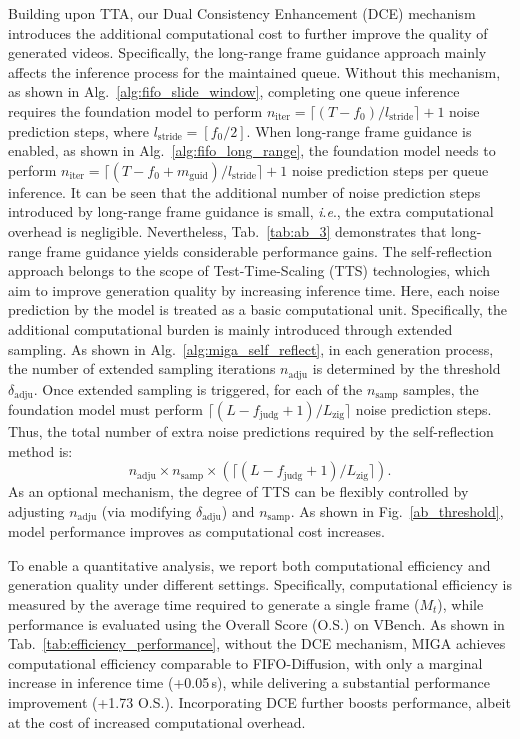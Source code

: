 \documentclass{article}
\theoremstyle{plain}
\theoremstyle{definition}
\theoremstyle{remark}
\newcommand{\ie}{\textit{i}.\textit{e}.}
\begin{document}
Building upon TTA, our Dual Consistency Enhancement (DCE) mechanism introduces the additional computational cost to further improve the quality of generated videos.
Specifically, the long-range frame guidance approach mainly affects the inference process for the maintained queue. Without this mechanism, as shown in Alg.~\ref{alg:fifo_slide_window}, completing one queue inference requires the foundation model to perform $n_\mathrm{iter} = \lceil (T - f_0) / l_\mathrm{stride} \rceil + 1$ noise prediction steps, where $l_\mathrm{stride} = [f_0 / 2]$.
When long-range frame guidance is enabled, as shown in Alg.~\ref{alg:fifo_long_range}, the foundation model needs to perform $n_\mathrm{iter} = \lceil (T - f_0 + m_\mathrm{guid}) / l_\mathrm{stride} \rceil + 1$ noise prediction steps per queue inference.  
It can be seen that the additional number of noise prediction steps introduced by long-range frame guidance is small, \ie, the extra computational overhead is negligible.
Nevertheless, Tab.~\ref{tab:ab_3} demonstrates that long-range frame guidance yields considerable performance gains.
The self-reflection approach belongs to the scope of Test-Time-Scaling (TTS) technologies, which aim to improve generation quality by increasing inference time. Here, each noise prediction by the model is treated as a basic computational unit.
Specifically, the additional computational burden is mainly introduced through extended sampling. 
As shown in Alg.~\ref{alg:miga_self_reflect}, in each generation process, the number of extended sampling iterations $n_{\mathrm{adju}}$ is determined by the threshold $\delta_{\mathrm{adju}}$. Once extended sampling is triggered, for each of the $n_{\mathrm{samp}}$ samples, the foundation model must perform $ \lceil (L - f_{\mathrm{judg}}+1) / L_{\mathrm{zig}} \rceil$ noise prediction steps.
Thus, the total number of extra noise predictions required by the self-reflection method is:
\begin{equation}
n_{\mathrm{adju}} \times n_{\mathrm{samp}} \times  \left( \lceil (L - f_{\mathrm{judg}}+1) / L_{\mathrm{zig}} \rceil \right ).
\end{equation}
As an optional mechanism, the degree of TTS can be flexibly controlled by adjusting $n_{\mathrm{adju}}$ (via modifying $\delta_{\mathrm{adju}}$) and $n_{\mathrm{samp}}$. As shown in Fig.~\ref{ab_threshold}, model performance improves as computational cost increases.

To enable a quantitative analysis, we report both computational efficiency and generation quality under different settings. Specifically, computational efficiency is measured by the average time required to generate a single frame ($M_t$), while performance is evaluated using the Overall Score (O.S.) on VBench. As shown in Tab.~\ref{tab:efficiency_performance}, without the DCE mechanism, MIGA achieves computational efficiency comparable to FIFO-Diffusion, with only a marginal increase in inference time (+0.05\,s), while delivering a substantial performance improvement (+1.73 O.S.). Incorporating DCE further boosts performance, albeit at the cost of increased computational overhead.
\end{document}
